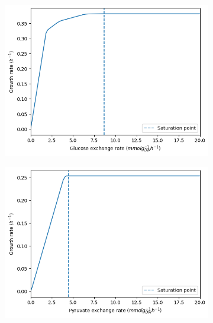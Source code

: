 \begin{figure}
  \centering
  \begin{subfigure}[t]{0.45\textwidth}
  \centering
    \includegraphics[width=\linewidth]{saturation_glc}
    \caption{
    }
    \label{fig:model-saturation-glucose}
  \end{subfigure}%
  \begin{subfigure}[t]{0.45\textwidth}
  \centering
    \includegraphics[width=\linewidth]{saturation_pyr}
    \caption{
    }
    \label{fig:model-saturation-pyruvate}
  \end{subfigure}


\end{figure}
